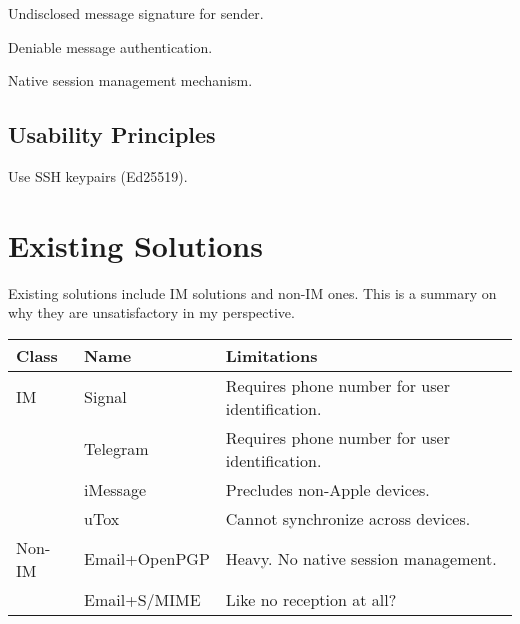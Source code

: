 \begin{compactitem}
	\item Undisclosed message signature for sender.
	\item Deniable message authentication.
	\item Native session management mechanism.
\end{compactitem}

\subsection{Usability Principles}

\begin{compactitem}
	\item Use SSH keypairs (Ed25519).
\end{compactitem}










\section{Existing Solutions}

Existing solutions include IM solutions and non-IM ones. This is a summary on why they are unsatisfactory in my perspective.

\begin{tabu}{|l|l|X|}
	\hline
	{Class}  & {Name}          & {Limitations}                                    \\
	\hline
	{IM}     & {Signal}        & {Requires phone number for user identification.} \\
	{ }      & {Telegram}      & {Requires phone number for user identification.} \\
	{ }      & {iMessage}      & {Precludes non-Apple devices.}                   \\
	{ }      & {uTox}          & {Cannot synchronize across devices.}             \\
	\hline
	{Non-IM} & {Email+OpenPGP} & {Heavy. No native session management.}           \\
	{ }      & {Email+S/MIME}  & {Like no reception at all?}                      \\
	\hline
\end{tabu}










